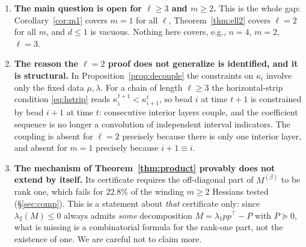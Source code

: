 \documentclass[11pt]{article}
\theoremstyle{definition}
\begin{document}
\begin{enumerate}
\item \textbf{The main question is open for $\ell\ge3$ and $m\ge2$.} This is the whole gap:
Corollary~\ref{cor:m1} covers $m=1$ for all $\ell$, Theorem~\ref{thm:ell2} covers $\ell=2$ for
all $m$, and $d\le1$ is vacuous. Nothing here covers, e.g., $n=4$, $m=2$, $\ell=3$.

\item \textbf{The reason the $\ell=2$ proof does not generalize is identified, and it is
structural.} In Proposition~\ref{prop:decouple} the constraints on $\kappa_i$ involve only the
fixed data $\mu,\lambda$. For a chain of length $\ell\ge3$ the horizontal-strip condition
\eqref{eq:hstrip} reads $\kappa^{t+1}_i<\kappa^{t}_{i+1}$, so bead $i$ at time $t+1$ is
constrained by bead $i+1$ at time $t$: consecutive interior layers couple, and the coefficient
sequence is no longer a convolution of independent interval indicators. The coupling is absent
for $\ell=2$ precisely because there is only one interior layer, and absent for $m=1$ precisely
because $i+1\equiv i$.

\item \textbf{The mechanism of Theorem~\ref{thm:product} provably does not extend by itself.}
Its certificate requires the off-diagonal part of $M^{(\beta)}$ to be rank one, which fails for
$22.8\%$ of the winding $m\ge2$ Hessians tested (\S\ref{sec:comp}). This is a statement about
\emph{that} certificate only: since $\lambda_2(M)\le0$ always admits \emph{some} decomposition
$M=\lambda_1pp^{\!\top}-P$ with $P\succeq0$, what is missing is a combinatorial formula for the
rank-one part, not the existence of one. We are careful not to claim more.


\end{enumerate}
\end{document}
